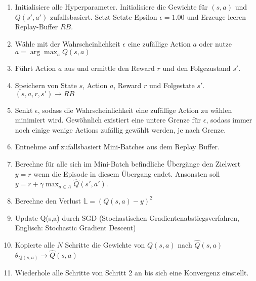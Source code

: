 \begin{enumerate} \label{alg:DQN}
	\item Initialisiere alle Hyperparameter. Initialisiere die Gewichte für $(s,a)$ und $Q(s',a')$ zufallsbasiert. Setzt Setzte Epsilon $\epsilon = 1.00$ und Erzeuge leeren Replay-Buffer $RB$.
	\item Wähle mit der Wahrscheinlichkeit $\epsilon$  eine zufällige Action $a$ oder nutze $a = \arg\max_{a} Q(s,a)$
	\item Führt Action $a$ aus und ermittle den Reward $r$ und den Folgezustand $s'$.
	\item Speichern von State $s$, Action $a$, Reward $r$ und Folgestate $s'$. $(s,a,r,s') \longrightarrow RB$
	\item Senkt $\epsilon$, sodass die Wahrscheinlichkeit eine zufällige Action zu wählen minimiert wird. Gewöhnlich existiert eine untere Grenze für $\epsilon$, sodass immer noch einige wenige Actions zufällig gewählt werden, je nach Grenze.
	\item Entnehme auf zufallsbasiert Mini-Batches aus dem Replay Buffer.
	\item Berechne für alle sich im Mini-Batch befindliche Übergänge den Zielwert $y = r$ wenn die Episode in diesem Übergang endet. Ansonsten soll $y = r + \gamma \max_{a \in A}\hat{Q}(s',a')$.
	\item Berechne den Verlust $\mathbb{L} = (Q(s,a) - y)^2$
	\item Update Q(s,a) durch SGD (Stochastischen Gradientenabstiegsverfahren, Englisch: Stochastic Gradient Descent)
	\item Kopierte alle $N$ Schritte die Gewichte von $Q(s,a)$ nach $\hat{Q}(s,a)$ $\theta_{Q(s,a)} \longrightarrow \hat{Q}(s,a)$
	\item Wiederhole alle Schritte von Schritt 2 an bis sich eine Konvergenz einstellt.
\end{enumerate}
